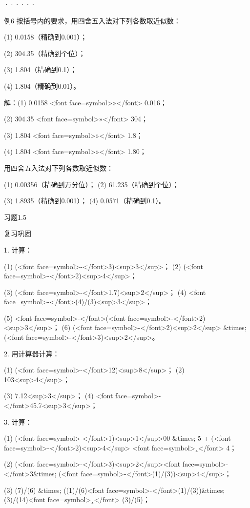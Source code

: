 ······

\beginexample
例6 按括号内的要求，用四舍五入法对下列各数取近似数：

(1) 0.0158（精确到0.001）；

(2) 304.35（精确到个位）；

(3) 1.804（精确到0.1）；

(4) 1.804（精确到0.01）。

解：(1) 0.0158  <font face=symbol>»</font>  0.016；

(2) 304.35  <font face=symbol>»</font>  304；

(3) 1.804  <font face=symbol>»</font>  1.8；

(4) 1.804  <font face=symbol>»</font>  1.80；

\endexample

\beginexeicise

用四舍五入法对下列各数取近似数：

(1) 0.00356（精确到万分位）；    (2) 61.235（精确到个位）；

(3) 1.8935（精确到0.001）；      (4) 0.0571（精确到0.1）。

习题1.5

复习巩固

1. 计算：

    (1) (<font face=symbol>-</font>3)<sup>3</sup>；    (2) (<font face=symbol>-</font>2)<sup>4</sup>；

    (3) (<font face=symbol>-</font>1.7)<sup>2</sup>；  (4) <font face=symbol>-</font>(4)/(3)<sup>3</sup>；

    (5) <font face=symbol>-</font>(<font face=symbol>-</font>2)<sup>3</sup>；   (6) (<font face=symbol>-</font>2)<sup>2</sup> &times; (<font face=symbol>-</font>3)<sup>2</sup>。

2. 用计算器计算：

    (1) (<font face=symbol>-</font>12)<sup>8</sup>；    (2) 103<sup>4</sup>；

    (3) 7.12<sup>3</sup>；       (4) <font face=symbol>-</font>45.7<sup>3</sup>；

3. 计算：

    (1) (<font face=symbol>-</font>1)<sup>1</sup>00 &times; 5 + (<font face=symbol>-</font>2)<sup>4</sup> <font face=symbol>¸</font> 4；

    (2) (<font face=symbol>-</font>3)<sup>2</sup><font face=symbol>-</font>3&times; (<font face=symbol>-</font>(1)/(3))<sup>4</sup>；

    (3) (7)/(6) &times; ((1)/(6)<font face=symbol>-</font>(1)/(3))&times; (3)/(14)<font face=symbol>¸</font> (3)/(5)；

